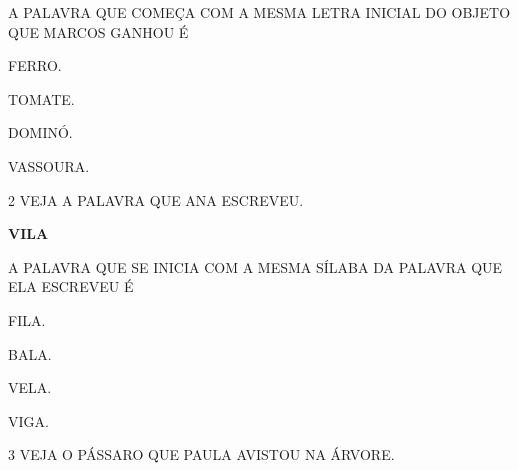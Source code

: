 A PALAVRA QUE COMEÇA COM A MESMA LETRA INICIAL DO OBJETO QUE MARCOS GANHOU É

\begin{escolha}

\item FERRO.

\item TOMATE.

\item DOMINÓ.

\item VASSOURA.

\end{escolha}

\num{2} VEJA A PALAVRA QUE ANA ESCREVEU.

\begin{center}
\textbf{VILA}
\end{center}

A PALAVRA QUE SE INICIA COM A MESMA SÍLABA DA PALAVRA QUE ELA ESCREVEU É

\begin{escolha}

\item FILA.

\item BALA.

\item VELA.

\item VIGA.

\end{escolha}

\num{3} VEJA O PÁSSARO QUE PAULA AVISTOU NA ÁRVORE.

